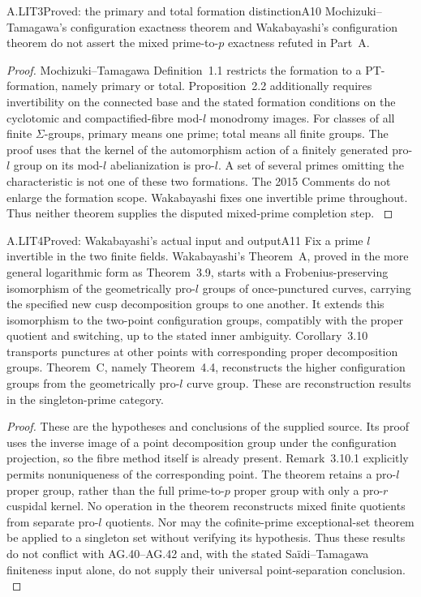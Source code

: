 \begin{claim}{A.LIT3}{Proved: the primary and total formation distinction}{A10}
Mochizuki--Tamagawa's configuration exactness theorem and Wakabayashi's
configuration theorem do not assert the mixed prime-to-$p$ exactness
refuted in Part~A.
\end{claim}
\begin{proof}
Mochizuki--Tamagawa Definition~1.1 restricts the formation to a
PT-formation, namely primary or total. Proposition~2.2 additionally
requires invertibility on the connected base and the stated formation
conditions on the cyclotomic and compactified-fibre mod-$l$ monodromy
images. For classes of all finite $\Sigma$-groups, primary means one
prime; total means all finite groups. The proof uses that the kernel of
the automorphism action of a finitely generated pro-$l$ group on its
mod-$l$ abelianization is pro-$l$. A set of several primes omitting the
characteristic is not one of these two formations. The 2015 Comments
do not enlarge the formation scope. Wakabayashi fixes one invertible
prime throughout. Thus neither theorem supplies the disputed
mixed-prime completion step.
\citep[Definition~1.1 and Proposition~2.2]{LA_MT2008}
\citep{LA_MT2015,LA_Wakabayashi2016}
\end{proof}

\begin{claim}{A.LIT4}{Proved: Wakabayashi's actual input and output}{A11}
Fix a prime $l$ invertible in the two finite fields. Wakabayashi's
Theorem~A, proved in the more general logarithmic form as Theorem~3.9,
starts with a Frobenius-preserving isomorphism of the geometrically
pro-$l$ groups of once-punctured curves, carrying the specified new
cusp decomposition groups to one another. It extends this isomorphism
to the two-point configuration groups, compatibly with the proper
quotient and switching, up to the stated inner ambiguity. Corollary~3.10
transports punctures at other points with corresponding proper
decomposition groups. Theorem~C, namely Theorem~4.4, reconstructs the
higher configuration groups from the geometrically pro-$l$ curve group.
These are reconstruction results in the singleton-prime category.
\end{claim}
\begin{proof}
These are the hypotheses and conclusions of the supplied source. Its
proof uses the inverse image of a point decomposition group under the
configuration projection, so the fibre method itself is already present.
Remark~3.10.1 explicitly permits nonuniqueness of the corresponding
point. The theorem retains a pro-$l$ proper group, rather than the full
prime-to-$p$ proper group with only a pro-$r$ cuspidal kernel. No operation
in the theorem reconstructs mixed finite quotients from separate
pro-$l$ quotients. Nor may the cofinite-prime exceptional-set theorem
be applied to a singleton set without verifying its hypothesis. Thus
these results do not conflict with AG.40--AG.42 and, with the stated
Sa\"idi--Tamagawa finiteness input alone, do not supply their universal
point-separation conclusion.
\citep[Theorems~3.9,4.4 and Corollary~3.10]{LA_Wakabayashi2016}
\end{proof}


